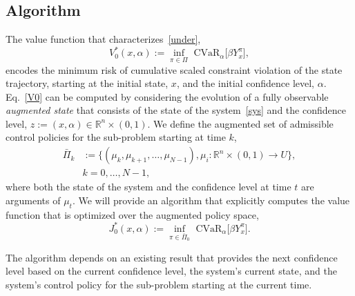 \documentclass[letterpaper, 10 pt, conference]{ieeeconf}  %
\begin{document}
\subsection{Algorithm}
The value function that characterizes~\eqref{under},
\begin{equation}
V_0^*(x,\alpha) := {\underset{\pi \in \Pi}\inf} \text{ CVaR}_\alpha \big[ \beta Y_x^\pi \big],
\label{V0}
\end{equation}
encodes the minimum risk of cumulative scaled constraint violation of the state trajectory, starting at the initial state, $x$, 
and the initial confidence level, $\alpha$. Eq.~\eqref{V0} can be computed by considering 
the evolution of a fully observable \textit{augmented state} that consists of the state of the system~\eqref{sys} and the confidence level,
$z := (x,\alpha) \in \mathbb{R}^n \times (0,1)$. We define the augmented set of admissible control policies for the sub-problem starting at time $k$,
\begin{equation}\begin{aligned}
\bar{\Pi}_k & := \{ (\mu_k, \mu_{k+1}, \dots, \mu_{N-1}), \mu_i: \mathbb{R}^n \times (0,1) \rightarrow U \},\\
 & k = 0, \dots, N-1,
\end{aligned}\label{augpi}\end{equation}
where both the state of the system and the confidence level at time $t$ are arguments of $\mu_t$. 
We will provide an algorithm that explicitly computes the value function that is optimized over the augmented policy space,
\begin{equation}
J_0^*(x,\alpha) := {\underset{\pi \in \bar{\Pi}_0}\inf} \text{ CVaR}_\alpha \big[ \beta Y_x^\pi \big].
\label{J0}
\end{equation}

The algorithm depends on an existing result that provides the next confidence level based on the current confidence level, the system's current state, and 
the system's control policy for the sub-problem starting at the current time.
\end{document}
